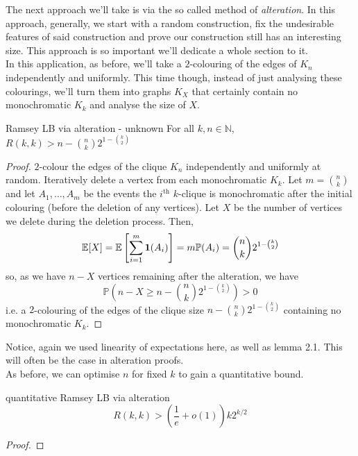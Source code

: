 \documentclass{article}
\begin{document}
The next approach we'll take is via the so called method of {\it alteration}. In this approach, generally,
we start with a random construction, fix the undesirable features of said construction and prove our construction 
still has an interesting size. This approach is so important we'll dedicate a whole section to it. \\ 

In this application, as before, we'll take a $2$-colouring of the edges of $K_n$ independently and uniformly. This 
time though, instead of just analysing these colourings, we'll turn them into graphs $K_X$ that certainly contain no 
monochromatic $K_k$ and analyse the size of $X$. 

\begin{proposition}[]{Ramsey LB via alteration - unknown}
    For all $k, n \in \mathbb{N}$, $R(k,k) > n - \binom{n}{k}2^{1-\binom{k}{2}}$
\end{proposition}

\begin{proof}
    $2$-colour the edges of the clique $K_n$ independently and uniformly at random. Iteratively delete a vertex 
    from each monochromatic $K_k$. Let $m = \binom{n}{k}$ and let $A_1, \dots, A_m$ be the events the $i^\text{th}$ 
    $k$-clique is monochromatic after the initial colouring (before the deletion of any vertices). Let $X$ be the 
    number of vertices we delete during the deletion process. Then, 
    \[\mathbb{E}[X] = \mathbb{E}\left[\sum_{i = 1}^m {\bf 1}(A_i)\right] = m\mathbb{P}(A_i) = \binom{n}{k}2^{1-\binom{k}{2}}\]
    so, as we have $n - X$ vertices remaining after the alteration, we have 
    \[\mathbb{P}\left(n - X \geq n - \binom{n}{k}2^{1-\binom{k}{2}}\right) > 0\]
    i.e. a $2$-colouring of the edges of the clique size $n - \binom{n}{k}2^{1-\binom{k}{2}}$ containing no monochromatic 
    $K_k$. 
\end{proof}

Notice, again we used linearity of expectations here, as well as lemma 2.1. This will often be the case in 
alteration proofs. \\ 

As before, we can optimise $n$ for fixed $k$ to gain a quantitative bound.

\begin{proposition}[]{quantitative Ramsey LB via alteration}
    \[R(k, k) > \left(\frac{1}{e} + o(1)\right)k2^{k/2}\]
\end{proposition}

\begin{proof}

\end{proof}
\end{document}

